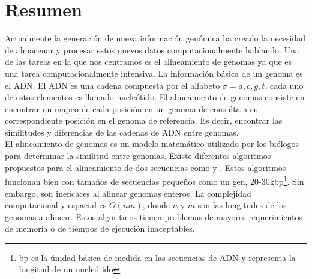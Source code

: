 \documentclass[12pt,a4paper]{article}
\begin{document}
\section{Resumen}
\indent
Actualmente la generación de nueva información genómica ha creado la necesidad de almacenar y procesar estos nuevos datos computacionalmente hablando. Una de las tareas en la que nos centramos es el alineamiento de genomas ya que es una tarea computacionalmente intensiva. La información básica de un genoma es el ADN. El ADN es una cadena compuesta por el alfabeto $\sigma={a,c,g,t}$, cada uno de estos elementos es llamado nucleótido. El alineamiento de genomas consiste en encontrar un mapeo de cada posición en un genoma de consulta a su correspondiente posición en el genoma de referencia. Es decir, encontrar las similitudes y diferencias de las cadenas de ADN entre genomas.\\
El alineamiento de genomas es un modelo matemático utilizado por los biólogos para determinar la similitud entre genomas. 
\indent
Existe diferentes algoritmos propuestos para el alineamiento de dos secuencias como \cite{Needleman1970General} y \cite{Waterman}. Estos algoritmos funcionan bien con tamaños de secuencias pequeños como un gen, 20-30kbp\footnote{bp es la únidad básica de medida en las secuencias de ADN y representa la longitud de un nucleótido}. Sin embargo, son ineficaces al alinear genomas enteros. La complejidad computacional y espacial es $O(nm)$, donde $n$ y $m$ son las longitudes de los genomas a alinear. Estos algoritmos tienen problemas de mayores requerimientos de memoria o de tiempos de ejecución inaceptables.\\
\end{document}
